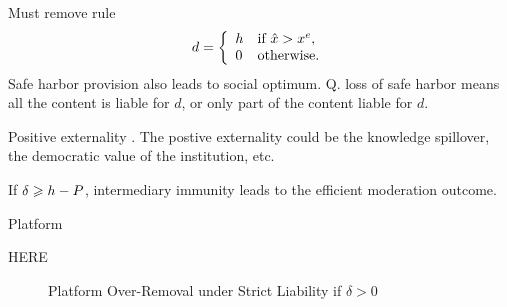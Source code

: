 Must remove rule
\begin{equation}
d=
\left\{\begin{array}{ll}
    h & \mbox{if $\hat{x}>x^e$}, \\
    0 & \mbox{otherwise}.
\end{array}\right.
\end{equation}
Safe harbor provision also leads to social optimum. Q. loss of safe harbor means all the content is liable for $d$, or only part of the content liable for $d$.

Positive externality . The postive externality could be the knowledge spillover, the democratic value of the institution, etc.

\begin{proposition}
If $\delta\geqslant h-P$, intermediary immunity leads to the efficient moderation outcome.    
\end{proposition}


Platform 




HERE






\begin{figure}[h]
    \centering
{}
    \caption{Platform Over-Removal under Strict Liability if $\delta>0$}
    \label{fig:removal}
\end{figure}



